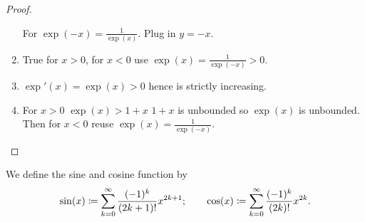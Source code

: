 \documentclass[10pt, a4paper]{article}
\begin{document}
\begin{theorem}
\begin{proof}
\begin{enumerate}[label = (\roman*)]
            For $\exp(-x) = \frac{1}{\exp(x)}$.
            Plug in $y = -x$.

            \item True for $x > 0$,
            for $x < 0$ use $\exp(x) = \frac{1}{\exp(-x)} > 0$.

            \item $\exp'(x) = \exp(x) > 0$ hence is strictly increasing.

            \item For $x > 0$ $\exp(x) > 1 + x$ $1 + x$ is unbounded so $\exp(x)$ is unbounded.
            Then for $x < 0$ reuse $\exp(x) = \frac{1}{\exp(-x)}$.
        \end{enumerate}
    \end{proof}
\end{theorem}

\begin{definition}
    We define the sine and cosine function by
    \[
    \sin(x) \coloneqq \sum_{k = 0}^{\infty}\frac{(-1) ^ k}{(2k + 1)!}x ^ {2k + 1};\qquad\cos(x) \coloneqq \sum_{k = 0}^{\infty}\frac{(-1) ^ k}{(2k)!}x ^ {2k}.
    \]
\end{definition}
\end{document}
